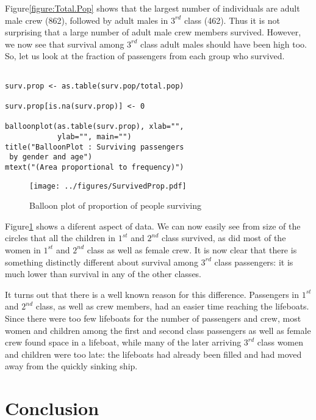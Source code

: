 \documentclass[a4paper]{report}
\begin{document}
\begin{article}
Figure\ref{figure:Total.Pop} shows that the largest number of
individuals are adult male crew (862), followed by adult males in
$3^{rd}$ class (462).  Thus it is not surprising that a large number of
adult male crew members survived.  However, we now see that survival
among $3^{rd}$ class adult males should have been high too.  So, let us
look at the fraction of passengers from each group who survived.

{\small
\begin{verbatim}

surv.prop <- as.table(surv.pop/total.pop)

surv.prop[is.na(surv.prop)] <- 0

balloonplot(as.table(surv.prop), xlab="",
            ylab="", main="")
title("BalloonPlot : Surviving passengers
 by gender and age")
mtext("(Area proportional to frequency)")
\end{verbatim}
}


\begin{figure}
\texttt{[image: ../figures/SurvivedProp.pdf]}
\caption{\label{figure:Surv.Prop}
Balloon plot of proportion of people surviving}
\end{figure}

Figure\ref{figure:Surv.Prop} shows a diferent aspect of data. We can
now easily see from size of the circles that all the children in
$1^{st}$ and $2^{nd}$ class survived, as did most of the women in
$1^{st}$ and $2^{nd}$ class as well as female crew.  It is now clear
that there is something distinctly different about survival among
$3^{rd}$ class passengers: it is much lower than survival in any of the
other classes.

It turns out that there is a well known reason for this difference.
Passengers in $1^{st}$ and $2^{nd}$ class, as well as crew members, had an
easier time reaching the lifeboats.  Since there were too few
lifeboats for the number of passengers and crew, most women and
children among the first and second class passengers as well as
female crew found space in a lifeboat, while many of the later
arriving $3^{rd}$  class women and children were too late: the lifeboats
had already been filled and had moved away from the quickly sinking
ship.

\section*{Conclusion}


\end{article}
\end{document}

